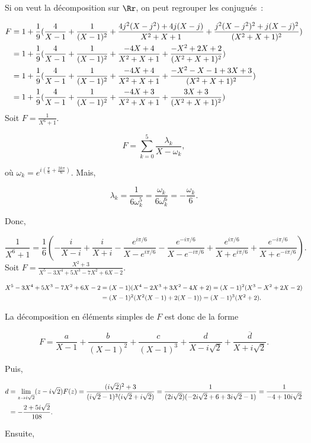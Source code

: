 {{Si on veut la décomposition sur $\Rr$, on peut regrouper les conjugués~:

\begin{align*}\ensuremath
F&=1+\frac{1}{9}(\frac{4}{X-1}+\frac{1}{(X-1)^2}+\frac{4j^2(X-j^2)+4j(X-j)}
{X^2+X+1}+\frac{j^2(X-j^2)^2+j(X-j)^2}{(X^2+X+1)^2})\\
 &=1+\frac{1}{9}(\frac{4}{X-1}+\frac{1}{(X-1)^2}+\frac{-4X+4}{X^2+X+1}+\frac{-X^2+2X+2}{(X^2+X+1)^2})\\
 &=1+\frac{1}{9}(\frac{4}{X-1}+\frac{1}{(X-1)^2}+\frac{-4X+4}{X^2+X+1}+\frac{-X^2-X-1+3X+3}{(X^2+X+1)^2})\\
 &=1+\frac{1}{9}(\frac{4}{X-1}+\frac{1}{(X-1)^2}+\frac{-4X+3}{X^2+X+1}+\frac{3X+3}{(X^2+X+1)^2})
\end{align*}
Soit $F=\frac{1}{X^6+1}$. 

$$F=\sum_{k=0}^{5}\frac{\lambda_k}{X-\omega_k},$$ 

où $\omega_k=e^{i(\frac{\pi}{6}+\frac{2k\pi}{6})}$. Mais, 

$$\lambda_k=\frac{1}{6\omega_k^5}=\frac{\omega_k}{6\omega_k^6}=-\frac{\omega_k}{6}.$$

Donc,

$$\frac{1}{X^6+1}=\frac{1}{6}(-\frac{i}{X-i}+\frac{i}{X+i}-\frac{e^{i\pi/6}}{X-e^{i\pi/6}}-\frac{e^{-i\pi/6}}{X-e^{-i\pi/6}}+
\frac{e^{i\pi/6}}{X+e^{i\pi/6}}+\frac{e^{-i\pi/6}}{X+e^{-i\pi/6}}).$$
Soit $F=\frac{X^2+3}{X^5-3X^4+5X^3-7X^2+6X-2}$.

\begin{align*}\ensuremath
X^5-3X^4+5X^3-7X^2+6X-2&=(X-1)(X^4-2X^3+3X^2-4X+2)=(X-1)^2(X^3-X^2+2X-2)\\
 &= (X-1)^2(X^2(X-1)+2(X-1))=(X-1)^3(X^2+2).
\end{align*}

La décomposition en éléments simples de $F$ est donc de la forme

$$F=\frac{a}{X-1}+\frac{b}{(X-1)^2}+\frac{c}{(X-1)^3}+\frac{d}{X-i\sqrt{2}}+\frac{\overline{d}}{X+i\sqrt{2}}.$$

Puis,

\begin{align*}\ensuremath
d&=\lim_{z \rightarrow i\sqrt{2}}(z-i\sqrt{2})F(z)=\frac{(i\sqrt{2})^2+3}{(i\sqrt{2}-1)^3(i\sqrt{2}+i\sqrt{2})}=
\frac{1}{(2i\sqrt{2})(-2i\sqrt{2}+6+3i\sqrt{2}-1)}=\frac{1}{-4+10i\sqrt{2}}\\
 &=-\frac{2+5i\sqrt{2}}{108}.
\end{align*}

Ensuite,

}}

